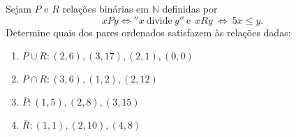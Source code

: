 \item Sejam $P$ e $R$ relações binárias em $\mathbb{N}$ definidas por
  \[\
	xPy \Leftrightarrow ''x\ \text{divide}\ y''\ \text{e}\ \ xRy\ \Leftrightarrow\ 5x\leq y. 
  \]
Determine quais dos pares ordenados satisfazem às relações dadas:
\begin{enumerate}
  \item $P\cup R:(2,6),(3,17),(2,1),(0,0)$
  \item $P\cap R:(3,6),(1,2),(2,12)$ 
  \item $\overline{P}:(1,5),(2,8),(3,15)$ 
  \item $\overline{R}:(1,1),(2,10),(4,8)$ 
\end{enumerate}
